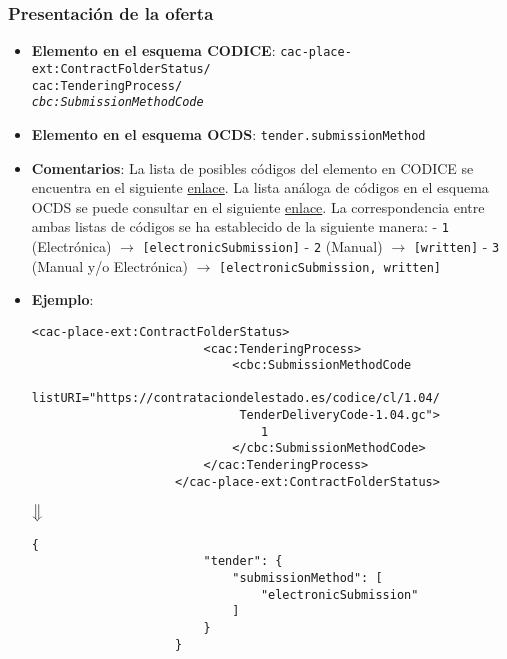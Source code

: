         \subsubsection{Presentación de la oferta} \label{subsec:PresentacionOferta}
        \begin{itemize}
            \item \textbf{Elemento en el esquema CODICE}:
                \tabto{7.6cm} \texttt{cac-place-ext:ContractFolderStatus/} \\
                \tabto{7.6cm} \texttt{cac:TenderingProcess/} \\
                \tabto{7.6cm} \texttt{\textit{cbc:SubmissionMethodCode}}
            \item \textbf{Elemento en el esquema OCDS}:
                \tabto{7.6cm} \texttt{tender.submissionMethod}
            \item \textbf{Comentarios}: La lista de posibles códigos del elemento en CODICE se encuentra en el siguiente 
                \href{https://contrataciondelestado.es/codice/cl/1.04/TenderDeliveryCode-1.04.gc}{enlace}.
                La lista análoga de códigos en el esquema OCDS se puede consultar en el siguiente
                \href{https://standard.open-contracting.org/latest/es/schema/codelists/#submission-method}{enlace}.
                La correspondencia entre ambas listas de códigos se ha establecido de la siguiente manera:
                    \subitem - \texttt{1} (Electrónica) $\rightarrow$ \texttt{[electronicSubmission]}
                    \subitem - \texttt{2} (Manual) $\rightarrow$ \texttt{[written]}
                    \subitem - \texttt{3} (Manual y/o Electrónica) $\rightarrow$ \texttt{[electronicSubmission, written]}
            \item \textbf{Ejemplo}: \\
                \begin{lstlisting}[language=lXML]
                    <cac-place-ext:ContractFolderStatus>
                        <cac:TenderingProcess>
                            <cbc:SubmissionMethodCode
                             listURI="https://contrataciondelestado.es/codice/cl/1.04/
                             TenderDeliveryCode-1.04.gc">
                                1
                            </cbc:SubmissionMethodCode>
                        </cac:TenderingProcess>
                    </cac-place-ext:ContractFolderStatus>
                \end{lstlisting}
                
                \begin{center}
                    $\big\Downarrow$
                \end{center}
                
                \begin{lstlisting}[language=lJSON]
                    {
                        "tender": {
                            "submissionMethod": [
                                "electronicSubmission"
                            ]
                        }
                    }
                \end{lstlisting}
        \end{itemize}
        
